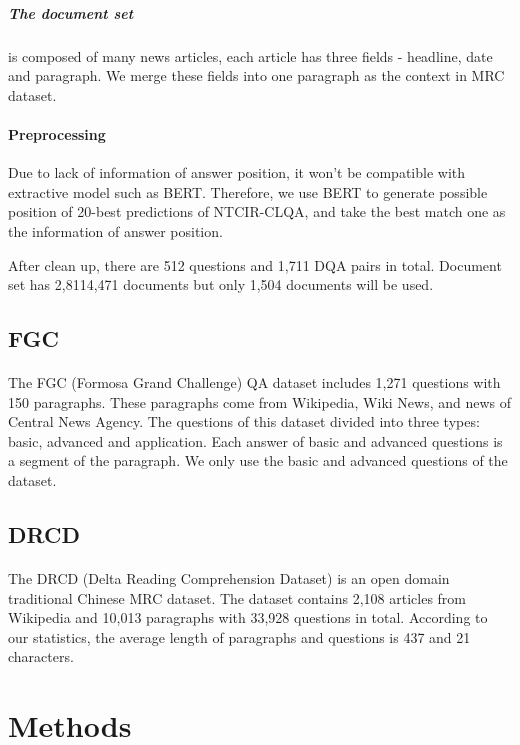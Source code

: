 \documentclass{article}
\begin{document}
\subparagraph{The document set} is composed of many news articles, each article has three fields - headline, date and paragraph. We merge these fields into one paragraph as the context in MRC dataset.

\paragraph{Preprocessing}
Due to lack of information of answer position, it won't be compatible with extractive model such as BERT. Therefore, we use BERT to generate possible position of 20-best predictions of NTCIR-CLQA, and take the best match one as the information of answer position.


After clean up, there are 512 questions and 1,711 DQA pairs in total. Document set has 2,8114,471 documents but only 1,504 documents will be used.

\subsection{FGC}
\paragraph{}
The FGC (Formosa Grand Challenge) QA dataset includes 1,271 questions with 150 paragraphs. These paragraphs come from Wikipedia, Wiki News, and news of Central News Agency. The questions of this dataset divided into three types: basic, advanced and application. Each answer of basic and advanced questions is a segment of the paragraph. We only use the basic and advanced questions of the dataset.

\subsection{DRCD}
\paragraph{}
The DRCD\cite{shao2018drcd} (Delta Reading Comprehension Dataset) is an open domain traditional Chinese MRC dataset. The dataset contains 2,108 articles from Wikipedia and 10,013 paragraphs with 33,928 questions in total. According to our statistics, the average length of paragraphs and questions is 437 and 21 characters.

\section{Methods}
\end{document}
